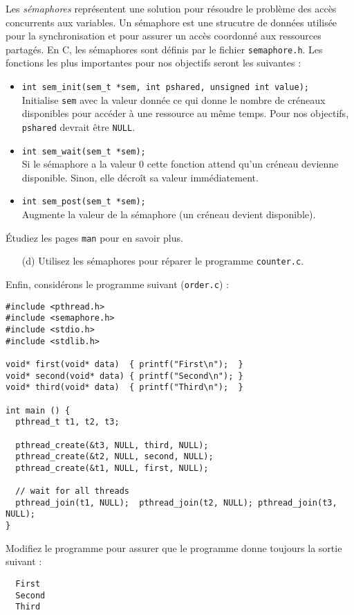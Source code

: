 \documentclass[11pt]{article}
\begin{document}
Les \emph{s\'emaphores} repr\'esentent une solution pour r\'esoudre le
probl\`eme des acc\`es concurrents aux variables. Un s\'emaphore est
une strucutre de donn\'ees utilis\'ee pour la synchronisation et pour
assurer un acc\`es coordonn\'e aux ressources partag\'es. En C,
les s\'emaphores sont d\'efinis par le fichier
\texttt{semaphore.h}. Les fonctions les plus importantes pour nos
objectifs seront les suivantes :
%
\begin{itemize}
\item
  \verb|int sem_init(sem_t *sem, int pshared, unsigned int value);|\\ 
  Initialise \verb|sem| avec la valeur donn\'ee ce qui donne le nombre
  de cr\'eneaux disponibles pour acc\'eder \`a une ressource au m\^eme temps.
  Pour nos objectifs, \verb|pshared| devrait \^etre \verb|NULL|.
\item \verb|int sem_wait(sem_t *sem);|\\ Si le s\'emaphore a la valeur 0
  cette fonction attend qu'un cr\'eneau devienne disponible. Sinon,
  elle d\'ecro\^it sa valeur imm\'ediatement.
\item \verb|int sem_post(sem_t *sem);|\\ Augmente la valeur de la
  s\'emaphore (un cr\'eneau devient disponible).
\end{itemize}
%
\'Etudiez les pages \verb|man| pour en savoir plus.

\begin{enumerate}
\item[(d)] Utilisez les s\'emaphores pour r\'eparer le programme \texttt{counter.c}.
\end{enumerate}

Enfin, consid\'erons le programme suivant (\texttt{order.c}) :
\begin{verbatim}
#include <pthread.h>
#include <semaphore.h>
#include <stdio.h>
#include <stdlib.h>

void* first(void* data)  { printf("First\n");  }
void* second(void* data) { printf("Second\n"); }
void* third(void* data)  { printf("Third\n");  }

int main () {
  pthread_t t1, t2, t3;
  
  pthread_create(&t3, NULL, third, NULL);
  pthread_create(&t2, NULL, second, NULL);
  pthread_create(&t1, NULL, first, NULL);

  // wait for all threads
  pthread_join(t1, NULL);  pthread_join(t2, NULL); pthread_join(t3, NULL);
}
\end{verbatim}
Modifiez le programme pour assurer que le programme donne toujours la
 sortie suivant :
\begin{verbatim}
  First
  Second
  Third
\end{verbatim}
\end{document}

